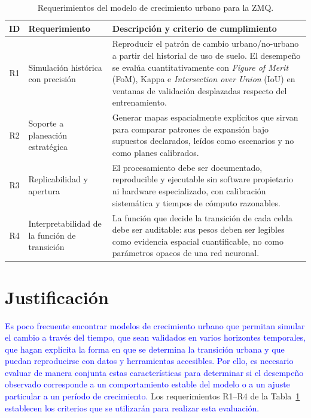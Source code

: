 \begin{table}[H]
	\centering
	\caption{Requerimientos del modelo de crecimiento urbano para la ZMQ.}
	\label{tab:requerimientos_modelo_1}
	\begin{tabularx}{\textwidth}{c >{\raggedright\arraybackslash}p{3.3cm} >{\raggedright\arraybackslash}X}
	\toprule
	\textbf{ID} & \textbf{Requerimiento} & \textbf{Descripción y criterio de cumplimiento} \\
	\midrule
	R1 & Simulación histórica con precisión &
	Reproducir el patrón de cambio urbano/no-urbano a partir del historial de uso de suelo.
	El desempeño se evalúa cuantitativamente con \textit{Figure of Merit} (FoM), Kappa e
	\textit{Intersection over Union} (IoU) en ventanas de validación
	desplazadas respecto del entrenamiento. \\
	\addlinespace
	R2 & Soporte a planeación estratégica &
	Generar mapas espacialmente explícitos que sirvan para comparar patrones de expansión
	bajo supuestos declarados, leídos como escenarios y no como planes calibrados. \\
	\addlinespace
	R3 & Replicabilidad y apertura &
	El procesamiento debe ser documentado, reproducible y ejecutable sin software propietario
	ni hardware especializado, con calibración sistemática y tiempos de cómputo razonables. \\
	\addlinespace
	R4 & Interpretabilidad de la función de transición &
	La función que decide la transición de cada celda debe ser auditable: sus pesos deben ser
	legibles como evidencia espacial cuantificable, no como parámetros opacos de una red
	neuronal. \\
	\bottomrule
	\end{tabularx}
\end{table}


\section{Justificación}

\textcolor{blue}{Es poco frecuente encontrar modelos de crecimiento urbano que permitan simular el cambio a través del tiempo, que sean validados en varios horizontes temporales, que hagan explícita la forma en que se determina la transición urbana y que puedan reproducirse con datos y herramientas accesibles. Por ello, es necesario evaluar de manera conjunta estas características para determinar si el desempeño observado corresponde a un comportamiento estable del modelo o a un ajuste particular a un período de crecimiento.} Los requerimientos R1--R4 de la Tabla~\ref{tab:requerimientos_modelo_1} \textcolor{blue}{establecen los criterios que se utilizarán para realizar esta evaluación.}

